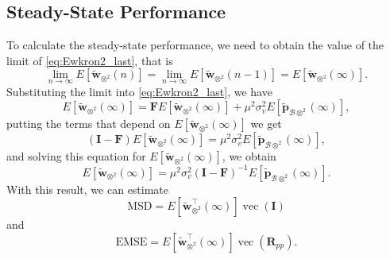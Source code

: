 \subsection{Steady-State Performance}

To calculate the steady-state performance, we need to obtain the value of the limit of \eqref{eq:Ewkron2_last}, that is
\begin{equation}
    \lim_{n\rightarrow\infty} E\left[ \tilde{\mathbf{w}}_{\otimes^2}(n)\right] = \lim_{n\rightarrow\infty} E\left[ \tilde{\mathbf{w}}_{\otimes^2}(n-1)\right] = E\left[ \tilde{\mathbf{w}}_{\otimes^2}(\infty)\right].
\end{equation}
Substituting the limit into \eqref{eq:Ewkron2_last}, we have
\begin{equation}
    E\left[ \tilde{\mathbf{w}}_{\otimes^2}(\infty)\right]  = \mathbf{F}E\left[ \tilde{\mathbf{w}}_{\otimes^2}(\infty) \right] +\mu^2 \sigma_{v}^2E\left[ \tilde{\mathbf{p}}_{\mathcal{B}\otimes^2}(\infty) \right],
\end{equation}
putting the terms that depend on $E\left[ \tilde{\mathbf{w}}_{\otimes^2}(\infty)\right]$ we get
\begin{equation}
    (\mathbf{I} - \mathbf{F})E\left[ \tilde{\mathbf{w}}_{\otimes^2}(\infty)\right]  =\mu^2 \sigma_{v}^2E\left[ \tilde{\mathbf{p}}_{\mathcal{B}\otimes^2}(\infty) \right],
\end{equation}
and solving this equation for $E\left[ \tilde{\mathbf{w}}_{\otimes^2}(\infty)\right]$, we obtain
\begin{equation}
    E\left[ \tilde{\mathbf{w}}_{\otimes^2}(\infty)\right]  =\mu^2 \sigma_{v}^2(\mathbf{I} - \mathbf{F})^{-1}E\left[ \tilde{\mathbf{p}}_{\mathcal{B}\otimes^2}(\infty) \right].
\end{equation}
With this result, we can estimate
\begin{equation}
    \text{MSD} = E\left[ \tilde{\mathbf{w}}^\top_{\otimes^2}(\infty)\right]\operatorname{vec}(\mathbf{I})
\end{equation}
and
\begin{equation}
    \text{EMSE} = E\left[ \tilde{\mathbf{w}}^\top_{\otimes^2}(\infty)\right]\operatorname{vec}(\mathbf{R}_{pp}).
\end{equation}